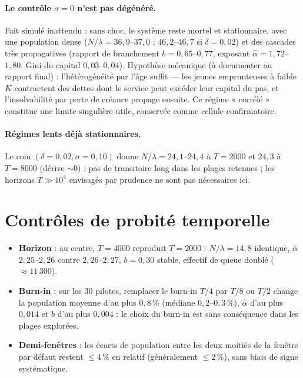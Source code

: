 \documentclass[11pt,a4paper]{article}
\begin{document}
\paragraph{Le contrôle $\sigma=0$ n'est pas dégénéré.} Fait simulé
inattendu : sans choc, le système reste mortel et stationnaire, avec une
population dense ($N/\lambda=36{,}9$--$37{,}0$ ; $46{,}2$--$46{,}7$ si
$\delta=0{,}02$) et des cascades très propagatives (rapport de
branchement $b=0{,}65$--$0{,}77$, exposant $\hat\alpha=1{,}72$--$1{,}80$,
Gini du capital $0{,}03$--$0{,}04$). Hypothèse mécanique (à documenter au
rapport final) : l'hétérogénéité par l'âge suffit — les jeunes
emprunteuses à faible $K$ contractent des dettes dont le service peut
excéder leur capital du pas, et l'insolvabilité par perte de créance
propage ensuite. Ce régime « corrélé » constitue une limite singulière
utile, conservée comme cellule confirmatoire.

\paragraph{Régimes lents déjà stationnaires.} Le coin
$(\delta{=}0{,}02,\sigma{=}0{,}10)$ donne $N/\lambda=24{,}1$--$24{,}4$ à
$T=2000$ et $24{,}3$ à $T=8000$ (dérive $\sim0$) : pas de transitoire
long dans les plages retenues ; les horizons $T\gg10^4$ envisagés par
prudence ne sont pas nécessaires ici.

\section{Contrôles de probité temporelle}
\label{sec:temps}

\begin{itemize}
\item \textbf{Horizon} : au centre, $T=4000$ reproduit $T=2000$ :
  $N/\lambda=14{,}8$ identique, $\hat\alpha$ $2{,}25$--$2{,}26$ contre
  $2{,}26$--$2{,}27$, $b=0{,}30$ stable, effectif de queue doublé
  ($\approx11\,300$).
\item \textbf{Burn-in} : sur les 30 pilotes, remplacer le burn-in $T/4$
  par $T/8$ ou $T/2$ change la population moyenne d'au plus $0{,}8\,\%$
  (médiane $0{,}2$--$0{,}3\,\%$), $\hat\alpha$ d'au plus $0{,}014$ et $b$
  d'au plus $0{,}004$ : le choix du burn-in est sans conséquence dans les
  plages explorées.
\item \textbf{Demi-fenêtres} : les écarts de population entre les deux
  moitiés de la fenêtre par défaut restent $\le4\,\%$ en relatif
  (généralement $\le2\,\%$), sans biais de signe systématique.
\end{itemize}
\end{document}
